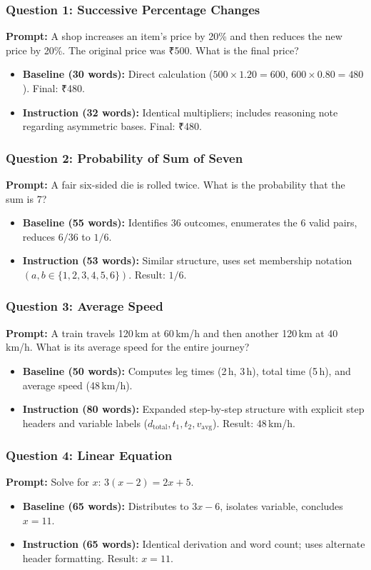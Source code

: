 \documentclass[11pt,a4paper]{article}
\begin{document}
\subsubsection{Question 1: Successive Percentage Changes}
\textbf{Prompt:} A shop increases an item's price by 20\% and then reduces the new price by 20\%. The original price was ₹500. What is the final price?
\begin{itemize}[leftmargin=*]
    \item \textbf{Baseline (30 words):} Direct calculation ($500 \times 1.20 = 600$, $600 \times 0.80 = 480$). Final: ₹480.
    \item \textbf{Instruction (32 words):} Identical multipliers; includes reasoning note regarding asymmetric bases. Final: ₹480.
\end{itemize}

\subsubsection{Question 2: Probability of Sum of Seven}
\textbf{Prompt:} A fair six-sided die is rolled twice. What is the probability that the sum is 7?
\begin{itemize}[leftmargin=*]
    \item \textbf{Baseline (55 words):} Identifies 36 outcomes, enumerates the 6 valid pairs, reduces $6/36$ to $1/6$.
    \item \textbf{Instruction (53 words):} Similar structure, uses set membership notation $(a,b \in \{1,2,3,4,5,6\})$. Result: $1/6$.
\end{itemize}

\subsubsection{Question 3: Average Speed}
\textbf{Prompt:} A train travels 120\,km at 60\,km/h and then another 120\,km at 40\,km/h. What is its average speed for the entire journey?
\begin{itemize}[leftmargin=*]
    \item \textbf{Baseline (50 words):} Computes leg times (2\,h, 3\,h), total time (5\,h), and average speed (48\,km/h).
    \item \textbf{Instruction (80 words):} Expanded step-by-step structure with explicit step headers and variable labels ($d_{\text{total}}, t_1, t_2, v_{\text{avg}}$). Result: 48\,km/h.
\end{itemize}

\subsubsection{Question 4: Linear Equation}
\textbf{Prompt:} Solve for $x$: $3(x-2)=2x+5$.
\begin{itemize}[leftmargin=*]
    \item \textbf{Baseline (65 words):} Distributes to $3x-6$, isolates variable, concludes $x=11$.
    \item \textbf{Instruction (65 words):} Identical derivation and word count; uses alternate header formatting. Result: $x=11$.
\end{itemize}
\end{document}

